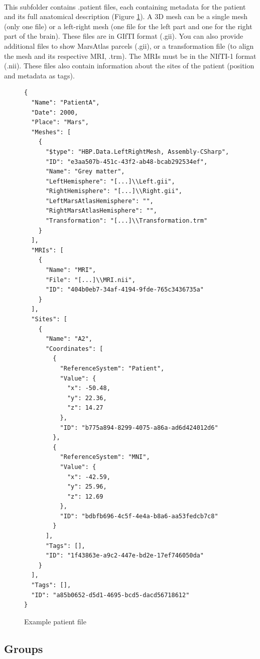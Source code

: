 \documentclass[a4paper]{article}
\begin{document}
\paragraph{} This subfolder contains .patient files, each containing metadata for the patient and its full anatomical description (Figure \ref{patientFile}). A 3D mesh can be a single mesh (only one file) or a left-right mesh (one file for the left part and one for the right part of the brain). These files are in GIfTI format (.gii). You can also provide additional files to show MarsAtlas parcels (.gii), or a transformation file (to align the mesh and its respective MRI, .trm). The MRIs must be in the NIfTI-1 format (.nii). These files also contain information about the sites of the patient (position and metadata as tags).
\begin{figure}[H]
\begin{lstlisting}
{
  "Name": "PatientA",
  "Date": 2000,
  "Place": "Mars",
  "Meshes": [
    {
      "$type": "HBP.Data.LeftRightMesh, Assembly-CSharp",
      "ID": "e3aa507b-451c-43f2-ab48-bcab292534ef",
      "Name": "Grey matter",
      "LeftHemisphere": "[...]\\Left.gii",
      "RightHemisphere": "[...]\\Right.gii",
      "LeftMarsAtlasHemisphere": "",
      "RightMarsAtlasHemisphere": "",
      "Transformation": "[...]\\Transformation.trm"
    }
  ],
  "MRIs": [
    {
      "Name": "MRI",
      "File": "[...]\\MRI.nii",
      "ID": "404b0eb7-34af-4194-9fde-765c3436735a"
    }
  ],
  "Sites": [
    {
      "Name": "A2",
      "Coordinates": [
        {
          "ReferenceSystem": "Patient",
          "Value": {
            "x": -50.48,
            "y": 22.36,
            "z": 14.27
          },
          "ID": "b775a894-8299-4075-a86a-ad6d424012d6"
        },
        {
          "ReferenceSystem": "MNI",
          "Value": {
            "x": -42.59,
            "y": 25.96,
            "z": 12.69
          },
          "ID": "bdbfb696-4c5f-4e4a-b8a6-aa53fedcb7c8"
        }
      ],
      "Tags": [],
      "ID": "1f43863e-a9c2-447e-bd2e-17ef746050da"
    }
  ],
  "Tags": [],
  "ID": "a85b0652-d5d1-4695-bcd5-dacd56718612"
}
\end{lstlisting}
\caption{\label{patientFile}Example patient file}
\end{figure}
\subsection{Groups}
\end{document}
